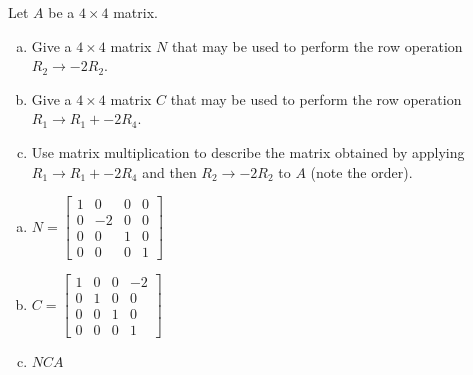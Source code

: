 
\begin{exerciseStatement}


Let \(A\) be a \(4 \times 4\) matrix.


\begin{enumerate}[(a)]
\item Give a \(4 \times 4\) matrix \(N\) that may be used to perform the row operation \( R_2 \to -2R_2 \).
\item Give a \(4 \times 4\) matrix \(C\) that may be used to perform the row operation \( R_1 \to R_1 + -2R_4 \).
\item Use matrix multiplication to describe the matrix obtained by applying \( R_1 \to R_1 + -2R_4 \) and then \( R_2 \to -2R_2 \) to \(A\) (note the order). 
\end{enumerate}
    
\end{exerciseStatement}
    
\begin{exerciseAnswer} 

\begin{enumerate}[(a)]
\item \(N= \left[\begin{array}{cccc}
1 & 0 & 0 & 0 \\
0 & -2 & 0 & 0 \\
0 & 0 & 1 & 0 \\
0 & 0 & 0 & 1
\end{array}\right] \)
\item \(C= \left[\begin{array}{cccc}
1 & 0 & 0 & -2 \\
0 & 1 & 0 & 0 \\
0 & 0 & 1 & 0 \\
0 & 0 & 0 & 1
\end{array}\right] \)
\item \(NCA\)
\end{enumerate}
    
\end{exerciseAnswer}
    
